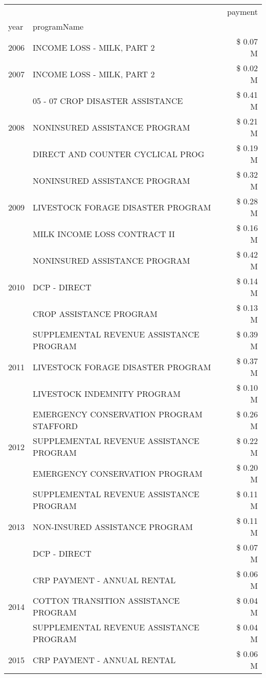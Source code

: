 \begin{tabular}{llr}
\toprule
 &  & payment \\
year & programName &  \\
\midrule
2006 & INCOME LOSS - MILK, PART 2 & \$ 0.07 M \\
\cline{1-3}
2007 & INCOME LOSS - MILK, PART 2 & \$ 0.02 M \\
\cline{1-3}
\multirow[t]{3}{*}{2008} & 05 - 07 CROP DISASTER ASSISTANCE & \$ 0.41 M \\
 & NONINSURED ASSISTANCE PROGRAM & \$ 0.21 M \\
 & DIRECT AND COUNTER CYCLICAL PROG & \$ 0.19 M \\
\cline{1-3}
\multirow[t]{3}{*}{2009} & NONINSURED ASSISTANCE PROGRAM & \$ 0.32 M \\
 & LIVESTOCK FORAGE DISASTER  PROGRAM & \$ 0.28 M \\
 & MILK INCOME LOSS CONTRACT II & \$ 0.16 M \\
\cline{1-3}
\multirow[t]{3}{*}{2010} & NONINSURED ASSISTANCE PROGRAM & \$ 0.42 M \\
 & DCP - DIRECT & \$ 0.14 M \\
 & CROP ASSISTANCE PROGRAM & \$ 0.13 M \\
\cline{1-3}
\multirow[t]{3}{*}{2011} & SUPPLEMENTAL REVENUE ASSISTANCE PROGRAM & \$ 0.39 M \\
 & LIVESTOCK FORAGE DISASTER PROGRAM & \$ 0.37 M \\
 & LIVESTOCK INDEMNITY PROGRAM & \$ 0.10 M \\
\cline{1-3}
\multirow[t]{3}{*}{2012} & EMERGENCY CONSERVATION PROGRAM STAFFORD & \$ 0.26 M \\
 & SUPPLEMENTAL REVENUE ASSISTANCE PROGRAM & \$ 0.22 M \\
 & EMERGENCY CONSERVATION PROGRAM & \$ 0.20 M \\
\cline{1-3}
\multirow[t]{3}{*}{2013} & SUPPLEMENTAL REVENUE ASSISTANCE PROGRAM & \$ 0.11 M \\
 & NON-INSURED ASSISTANCE PROGRAM & \$ 0.11 M \\
 & DCP - DIRECT & \$ 0.07 M \\
\cline{1-3}
\multirow[t]{3}{*}{2014} & CRP PAYMENT - ANNUAL RENTAL & \$ 0.06 M \\
 & COTTON TRANSITION ASSISTANCE PROGRAM & \$ 0.04 M \\
 & SUPPLEMENTAL REVENUE ASSISTANCE PROGRAM & \$ 0.04 M \\
\cline{1-3}
\multirow[t]{3}{*}{2015} & CRP PAYMENT - ANNUAL RENTAL & \$ 0.06 M \\

\end{tabular}
